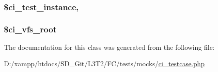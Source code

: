 \subsubsection[{\$ci\+\_\+test\+\_\+instance}]{\setlength{\rightskip}{0pt plus 5cm}\$ci\+\_\+test\+\_\+instance\hspace{0.3cm}{\ttfamily [static]}, {\ttfamily [protected]}}\label{class_c_i___test_case_abd33ad74f11902c8e804d62e27136aa2}
\hypertarget{class_c_i___test_case_a5cc3c10d43e82ad7c4227a2ba74d81a1}{}
\subsubsection[{\$ci\+\_\+vfs\+\_\+root}]{\setlength{\rightskip}{0pt plus 5cm}\$ci\+\_\+vfs\+\_\+root}\label{class_c_i___test_case_a5cc3c10d43e82ad7c4227a2ba74d81a1}


The documentation for this class was generated from the following file\+:\begin{DoxyCompactItemize}
\item 
D\+:/xampp/htdocs/\+S\+D\+\_\+\+Git/\+L3\+T2/\+F\+C/tests/mocks/\hyperlink{ci__testcase_8php}{ci\+\_\+testcase.\+php}\end{DoxyCompactItemize}
